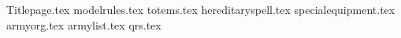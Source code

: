 \documentclass[a4paper,10pt]{article}
\begin{document}
{Titlepage.tex}
{modelrules.tex}
\newpage
{totems.tex}
\additionalspacebeforemaintitle{}
{hereditaryspell.tex}
\newpage
{specialequipment.tex}
\additionalspacebeforemaintitle{}
{armyorg.tex}
\newpage
{armylist.tex}
\newpage
{qrs.tex}
\end{document}
